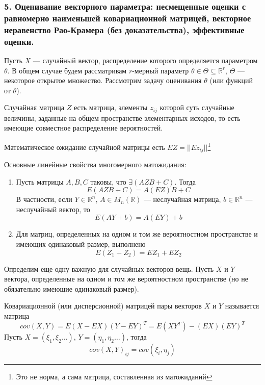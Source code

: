 \documentclass[12pt, russian]{article}
\begin{document}
\newpage
\subsubsection*{5. Оценивание векторного параметра: несмещенные оценки с равномерно наименьшей ковариационной матрицей, векторное неравенство Рао-Крамера (без доказательства), эффективные оценки.}

Пусть $X$ --- случайный вектор, распределение которого определяется параметром $\theta$. В общем случае будем рассматривам $r$-мерный параметр $\theta\in\Theta\subseteq\mathbb{R}^r,\,\Theta$ --- некоторое открытое множество. Рассмотрим задачу оценивания $\theta$ (или функций от $\theta$).

\begin{mydef}
Случайная матрица $Z$ есть матрица, элементы $z_{ij}$ которой суть случайные величины, заданные на общем пространстве элементарных исходов, то есть имеющие совместное распределение вероятностей. 
\end{mydef}

\begin{mydef}
Математическое ожидание случайной матрицы есть $EZ = ||Ez_{ij}||$\footnote{Это не норма, а сама матрица, составленная из матожиданий}
\end{mydef}

Основные линейные свойства многомерного матожидания:
\begin{enumerate}
\item
Пусть матрицы $A, B, C$ таковы, что $\exists(AZB + C)$. Тогда
$$ E(AZB + C) = A(EZ)B + C $$
В частности, если $Y\in\mathbb{R}^n$, $A\in M_n(\mathbb{R})$ --- неслучайная матрица, $b\in\mathbb{R}^n$ --- неслучайный вектор, то
$$ E(AY + b) = A(EY) + b $$
\item
Для матриц, определенных на одном и том же вероятностном пространстве и имеющих одинаковый размер, выполнено
$$ E(Z_1 + Z_2) = EZ_1 + EZ_2 $$
\end{enumerate}

Определим еще одну важную для случайных векторов вещь. Пусть $X$ и $Y$ --- вектора, определенные на одном и том же вероятностном пространстве (но не обязательно имеющие одинаковый размер).
\begin{mydef}
Ковариационной (или дисперсионной) матрицей пары векторов $X$ и $Y$ называется матрица
$$ cov(X, Y) = E(X -EX)(Y-EY)^T = E(XY^T) - (EX)(EY)^T $$
Пусть $X = (\xi_1, \xi_2 \ldots),\,Y= (\eta_1, \eta_2\ldots)$, тогда 
$$ cov(X, Y)_{ij} = cov(\xi_i, \eta_j) $$
\end{mydef}
\end{document}
